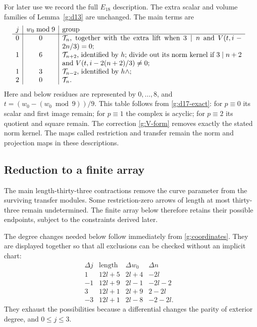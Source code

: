 \documentclass[11pt]{article}
\theoremstyle{definition}
\theoremstyle{remark}
\numberwithin{equation}{section}
\begin{document}
For later use we record the full $E_{18}$ description.  The
extra scalar and volume families of Lemma~\ref{g:d13} are
unchanged.  The main terms are
\begin{equation}\label{g:E18}
\begin{array}{c|c|p{9.1cm}}
 j&w_0\bmod9&\text{group}\\\hline
 0&0&$\mathcal T_n$, together with the extra lift when
 $3\mid n$ and $V(t,i-2n/3)=0$;\\
 1&6&$\mathcal T_{n+2}$, identified by $h$; divide out its
 norm kernel if $3\mid n+2$ and
 $V(t,i-2(n+2)/3)\ne0$;\\
 1&3&$\mathcal T_{n-2}$, identified by $h\wedge$;\\
 2&0&$\mathcal T_n$.
\end{array}
\end{equation}
Here and below residues are represented by $0,\ldots,8$, and
$t=(w_0-(w_0\bmod9))/9$.  This table follows from
\eqref{g:d17-exact}: for $p\equiv0$ its scalar and first
image remain; for $p\equiv1$ the complex is acyclic;
for $p\equiv2$ its quotient and square remain.  The
correction \eqref{g:V-form} removes exactly the stated
norm kernel.  The maps called restriction and transfer
remain the norm and projection maps in these descriptions.

\subsection{Reduction to a finite array}

The main length-thirty-three contractions remove the curve parameter
from the surviving transfer modules. Some restriction-zero arrows of
length at most thirty-three remain undetermined. The finite array below
therefore retains their possible endpoints, subject to the constraints
derived later.

The degree changes needed below follow immediately from
\eqref{g:coordinates}.  They are displayed together so that
all exclusions can be checked without an implicit chart:
\begin{equation}\label{g:raw-lengths}
\begin{array}{c|c|c|c}
 \Delta j&\text{length}&\Delta w_0&\Delta n\\\hline
 1&12l+5&2l+4&-2l\\
 -1&12l+9&2l-1&-2l-2\\
 3&12l+1&2l+9&2-2l\\
 -3&12l+1&2l-8&-2-2l.
\end{array}
\end{equation}
They exhaust the possibilities because a differential changes
the parity of exterior degree, and $0\le j\le3$.
\end{document}
